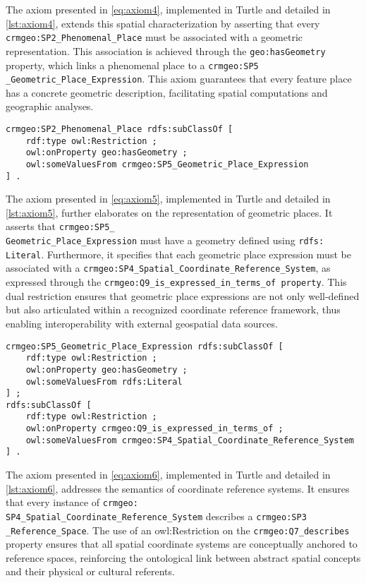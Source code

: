 The axiom presented in \ref{eq:axiom4}, implemented in Turtle and detailed in \ref{lst:axiom4}, extends this spatial characterization by asserting that every \texttt{crmgeo:SP2\_Phenomenal\_Place} must be associated with a geometric representation. This association is achieved through the \texttt{geo:hasGeometry} property, which links a phenomenal place to a \texttt{crmgeo:SP5\\\_Geometric\_Place\_Expression}. This axiom guarantees that every feature place has a concrete geometric description, facilitating spatial computations and geographic analyses.
\begin{lstlisting}[caption=Axiom \ref{eq:axiom4} in  in NOnt+S, label={lst:axiom4}]
crmgeo:SP2_Phenomenal_Place rdfs:subClassOf [
    rdf:type owl:Restriction ;
    owl:onProperty geo:hasGeometry ;
    owl:someValuesFrom crmgeo:SP5_Geometric_Place_Expression
] .
\end{lstlisting}

The axiom presented in \ref{eq:axiom5}, implemented in Turtle and detailed in \ref{lst:axiom5}, further elaborates on the representation of geometric places. It asserts that \texttt{crmgeo:SP5\_\\Geometric\_Place\_Expression} must have a geometry defined using \texttt{rdfs:\\Literal}. Furthermore, it specifies that each geometric place expression must be associated with a \texttt{crmgeo:SP4\_Spatial\_Coordinate\_Reference\_System}, as expressed through the \texttt{crmgeo:Q9\_is\_expressed\_in\_terms\_of property}. This dual restriction ensures that geometric place expressions are not only well-defined but also articulated within a recognized coordinate reference framework, thus enabling interoperability with external geospatial data sources.
\begin{lstlisting}[caption=Axiom \ref{eq:axiom5} in  in NOnt+S, label={lst:axiom5}]
crmgeo:SP5_Geometric_Place_Expression rdfs:subClassOf [
    rdf:type owl:Restriction ;
    owl:onProperty geo:hasGeometry ;
    owl:someValuesFrom rdfs:Literal
] ;
rdfs:subClassOf [
    rdf:type owl:Restriction ;
    owl:onProperty crmgeo:Q9_is_expressed_in_terms_of ;
    owl:someValuesFrom crmgeo:SP4_Spatial_Coordinate_Reference_System
] .
\end{lstlisting}

The axiom presented in \ref{eq:axiom6}, implemented in Turtle and detailed in \ref{lst:axiom6}, addresses the semantics of coordinate reference systems. It ensures that every instance of \texttt{crmgeo:\\SP4\_Spatial\_Coordinate\_Reference\_System} describes a \texttt{crmgeo:SP3\\\_Reference\_Space}. The use of an owl:Restriction on the \texttt{crmgeo:Q7\_describes} property ensures that all spatial coordinate systems are conceptually anchored to reference spaces, reinforcing the ontological link between abstract spatial concepts and their physical or cultural referents.

